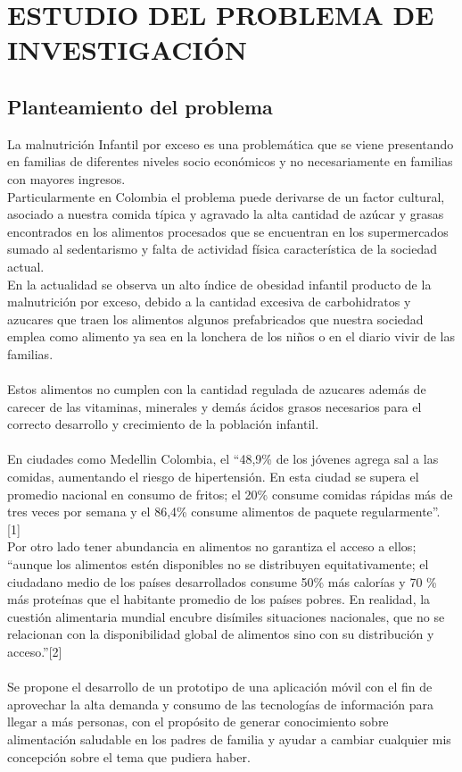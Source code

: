 \section{ESTUDIO DEL PROBLEMA DE INVESTIGACIÓN}
\subsection{Planteamiento del problema}
La malnutrición Infantil por exceso es una problemática que se viene presentando en familias de diferentes niveles socio económicos y no necesariamente en familias con mayores ingresos.\\

Particularmente en Colombia el problema puede derivarse de un factor cultural, asociado a nuestra comida típica y agravado la alta cantidad de azúcar y grasas encontrados en los alimentos procesados que se encuentran en los supermercados sumado al sedentarismo y falta de actividad física característica de la sociedad actual.\\
En la actualidad se observa un alto índice de obesidad infantil producto de la malnutrición por exceso, debido a la cantidad excesiva de carbohidratos y azucares que traen los alimentos algunos prefabricados que nuestra sociedad emplea como alimento ya sea en la lonchera de los niños o en el diario vivir de las familias.\\\\

Estos alimentos no cumplen con la cantidad regulada de azucares además de carecer de las vitaminas, minerales y demás ácidos grasos necesarios para el correcto desarrollo y crecimiento de la población infantil.\\\\
En ciudades como Medellin Colombia, el “48,9\% de los jóvenes agrega sal a las comidas, aumentando el riesgo de hipertensión. En esta ciudad se supera el promedio nacional en consumo de fritos; el 20\% consume comidas rápidas más de tres veces por semana y el 86,4\% consume alimentos de paquete regularmente”. [1]\\

Por otro lado tener abundancia en alimentos no garantiza el acceso a ellos; “aunque los alimentos estén disponibles no se distribuyen equitativamente; el ciudadano medio de los países desarrollados consume 50\% más calorías y 70 \% más proteínas que el habitante promedio de los países pobres. En realidad, la cuestión alimentaria mundial encubre disímiles situaciones nacionales, que no se relacionan con la disponibilidad global de alimentos sino con su distribución y acceso.”[2] 
\\\\
Se propone el desarrollo de un prototipo de una aplicación móvil con el fin de aprovechar la alta demanda y consumo de las tecnologías de información para llegar a más personas, con el propósito de generar conocimiento sobre alimentación saludable en los padres de familia  y ayudar a cambiar cualquier mis concepción sobre el tema que pudiera haber. 
